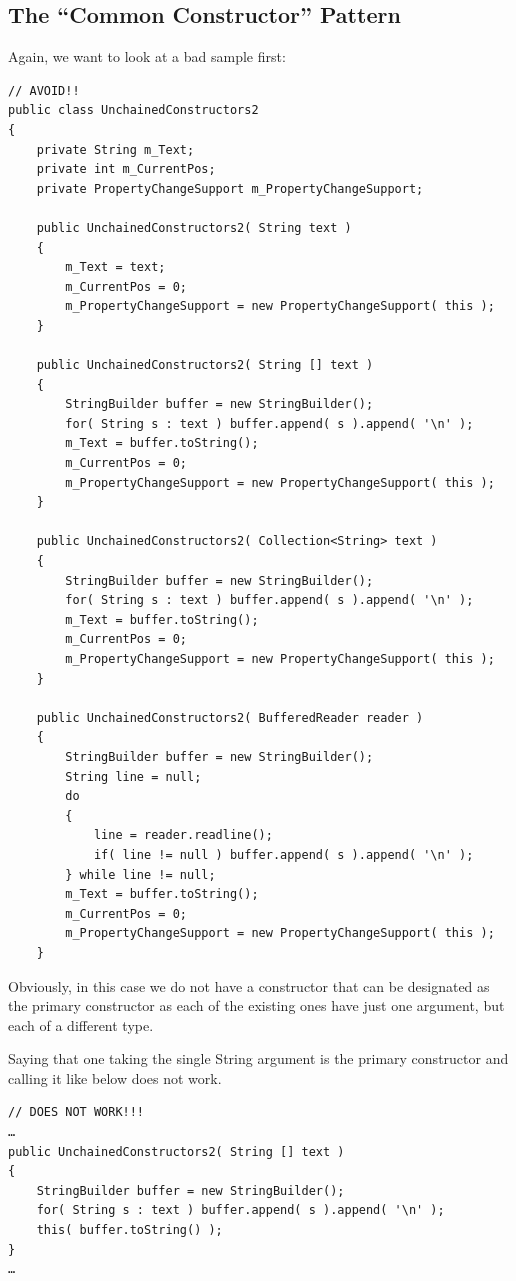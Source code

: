 \documentclass[11pt,a4paper, titlepage, parskip=half, headsepline, footsepline, cleardoublepage=current, headheight=1cm]{scrbook}
\begin{document}
\subsection{The “Common Constructor” Pattern}
Again, we want to look at a bad sample first:
\begin{lstlisting}
// AVOID!!
public class UnchainedConstructors2
{
    private String m_Text;
    private int m_CurrentPos;
    private PropertyChangeSupport m_PropertyChangeSupport;
    
    public UnchainedConstructors2( String text )
    {
        m_Text = text;
        m_CurrentPos = 0;
        m_PropertyChangeSupport = new PropertyChangeSupport( this );
    }

    public UnchainedConstructors2( String [] text )
    {
        StringBuilder buffer = new StringBuilder();
        for( String s : text ) buffer.append( s ).append( '\n' );
        m_Text = buffer.toString();
        m_CurrentPos = 0;
        m_PropertyChangeSupport = new PropertyChangeSupport( this );
    }

    public UnchainedConstructors2( Collection<String> text )
    {
        StringBuilder buffer = new StringBuilder();
        for( String s : text ) buffer.append( s ).append( '\n' );
        m_Text = buffer.toString();
        m_CurrentPos = 0;
        m_PropertyChangeSupport = new PropertyChangeSupport( this );
    }

    public UnchainedConstructors2( BufferedReader reader )
    {
        StringBuilder buffer = new StringBuilder();
        String line = null;
        do
        {
            line = reader.readline();
            if( line != null ) buffer.append( s ).append( '\n' );
        } while line != null;
        m_Text = buffer.toString();
        m_CurrentPos = 0;
        m_PropertyChangeSupport = new PropertyChangeSupport( this );
    }
\end{lstlisting}

Obviously, in this case we do not have a constructor that can be designated as the primary constructor as each of the existing ones have just one argument, but each of a different type.

Saying that one taking the single String argument is the primary constructor and calling it like below does not work.
\begin{lstlisting}
// DOES NOT WORK!!!
…
public UnchainedConstructors2( String [] text )
{
    StringBuilder buffer = new StringBuilder();
    for( String s : text ) buffer.append( s ).append( '\n' );
    this( buffer.toString() );
}
…
\end{lstlisting}
\end{document}
